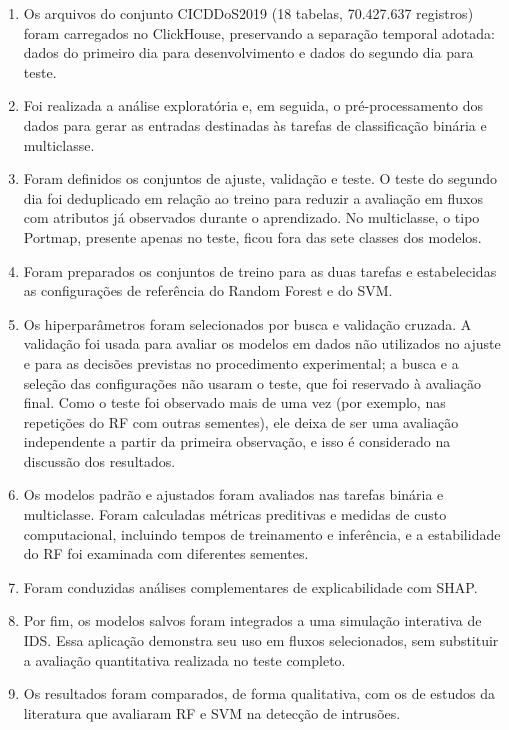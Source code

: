 \documentclass[
    12pt,                %
    openright,           %
    oneside,             %
    a4paper,             %
    english,             %
    brazil               %
]{abntex2}
\begin{document}
\begin{enumerate}
\def\labelenumi{\arabic{enumi}.}
\item
  Os arquivos do conjunto CICDDoS2019 (18 tabelas, 70.427.637 registros) foram carregados no ClickHouse, preservando a separação temporal adotada: dados do primeiro dia para desenvolvimento e dados do segundo dia para teste.
\item
  Foi realizada a análise exploratória e, em seguida, o pré-processamento dos dados para gerar as entradas destinadas às tarefas de classificação binária e multiclasse.
\item
  Foram definidos os conjuntos de ajuste, validação e teste. O teste do segundo dia foi deduplicado em relação ao treino para reduzir a avaliação em fluxos com atributos já observados durante o aprendizado. No multiclasse, o tipo Portmap, presente apenas no teste, ficou fora das sete classes dos modelos.
\item
  Foram preparados os conjuntos de treino para as duas tarefas e estabelecidas as configurações de referência do Random Forest e do SVM.
\item
  Os hiperparâmetros foram selecionados por busca e validação cruzada. A validação foi usada para avaliar os modelos em dados não utilizados no ajuste e para as decisões previstas no procedimento experimental; a busca e a seleção das configurações não usaram o teste, que foi reservado à avaliação final. Como o teste foi observado mais de uma vez (por exemplo, nas repetições do RF com outras sementes), ele deixa de ser uma avaliação independente a partir da primeira observação, e isso é considerado na discussão dos resultados.
\item
  Os modelos padrão e ajustados foram avaliados nas tarefas binária e multiclasse. Foram calculadas métricas preditivas e medidas de custo computacional, incluindo tempos de treinamento e inferência, e a estabilidade do RF foi examinada com diferentes sementes.
\item
  Foram conduzidas análises complementares de explicabilidade com SHAP.
\item
  Por fim, os modelos salvos foram integrados a uma simulação interativa de IDS. Essa aplicação demonstra seu uso em fluxos selecionados, sem substituir a avaliação quantitativa realizada no teste completo.
\item
  Os resultados foram comparados, de forma qualitativa, com os de estudos da literatura que avaliaram RF e SVM na detecção de intrusões.
\end{enumerate}
\end{document}
